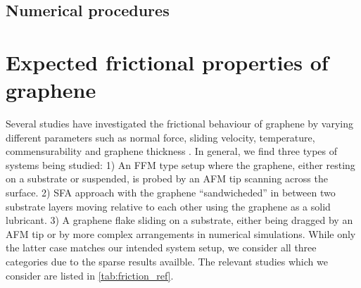 



\subsection{Numerical procedures}



\section{Expected frictional properties of graphene}\label{sec:expected_prop}



Several studies have investigated the frictional behaviour of graphene by varying different parameters such as normal force, sliding velocity, temperature, commensurability and graphene thickness \cite{penkov_tribology_2014}. In general, we find three types of systems being studied: 1) An \acrshort{FFM} type setup where the graphene, either resting on a substrate or suspended, is probed by an \acrshort{AFM} tip scanning across the surface. 2) \acrshort{SFA} approach with the graphene ``sandwicheded'' in between two substrate layers moving relative to each other using the graphene as a solid lubricant. 3) A graphene flake sliding on a substrate, either being dragged by an \acrshort{AFM} tip or by more complex arrangements in numerical simulations. While only the latter case matches our intended system setup, we consider all three categories due to the sparse results availble. The relevant studies which we consider are listed in \cref{tab:friction_ref}. 



